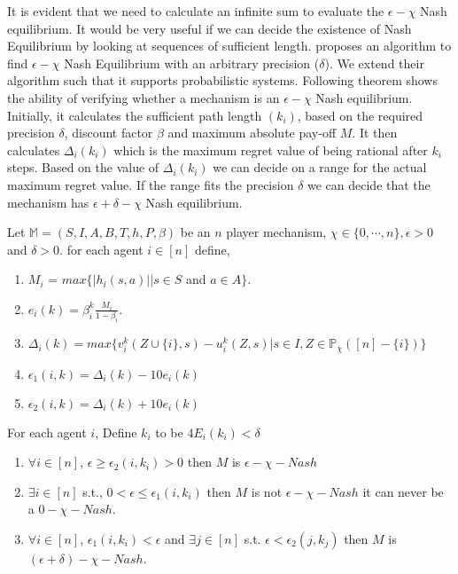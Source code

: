 
It is evident that we need to calculate an infinite sum to evaluate the $\epsilon - \chi$ Nash equilibrium. It would be very useful if we can decide the existence of Nash Equilibrium by looking at sequences of sufficient length. \cite{MMS08} proposes an algorithm to find $\epsilon - \chi$ Nash Equilibrium with an arbitrary precision ($\delta$). We extend their algorithm such that it supports probabilistic systems. Following theorem shows the ability of verifying whether a mechanism is an $\epsilon - \chi$ Nash equilibrium. Initially, it calculates the sufficient path length $(k_i)$, based on the required precision $\delta$, discount factor $\beta$ and maximum absolute pay-off $M$. It then calculates  $\Delta_i(k_i)$ which is the maximum regret value of being rational after $k_i$ steps. Based on the value of $\Delta_i(k_i)$ we can decide on a range for the actual maximum regret value. If the range fits the precision $\delta$ we can decide that the mechanism has $\epsilon + \delta- \chi$ Nash equilibrium.


\begin{theorem}
	\label{thm : correctness}
	Let $\mathbb{M} = (S,I,A,B,T,h,P,\beta)$ be an $n$ player mechanism, $\chi \in \{0,\cdots,n\}, \epsilon > 0$ and $\delta > 0$. for each agent $i \in [n]$ define, \\
	\begin{enumerate}
		\item $M_i$ = $max \{|h_i(s,a)| | s \in S$ and $a \in A\}$.
		\item $e_i(k) = \beta_i^{k} \frac{M_i}{1-\beta_i}$.
		\item $\Delta_i(k)=max\{v_i^{k}(Z \cup \{i\},s)- u_i^{k}(Z,s)|s\in I, Z \in \mathbb{P}_\chi([n]-\{i\}) \}$
		\item $\epsilon_1(i,k) = \Delta_i(k) - 10e_i(k)$
		\item $\epsilon_2(i,k) = \Delta_i(k) + 10e_i(k)$
	\end{enumerate}
	For each agent $i$, Define $k_i$ to be $4E_i(k_i) < \delta$\\
	\begin{enumerate}
		\item {} $\forall i \in [n]$, $\epsilon \ge \epsilon_2(i,k_i) > 0$ then $M$ is $\epsilon-\chi-Nash$
		\item {} $\exists i \in [n]$ s.t., $0 < \epsilon \le \epsilon_1(i,k_i)$ then $M$ is not $\epsilon-\chi-Nash$ it can never be a $0-\chi-Nash$.
		\item {} $\forall i \in [n]$, $\epsilon_1(i,k_i) < \epsilon$ and $\exists j \in [n]$ s.t. $\epsilon < \epsilon_2(j,k_j)$ then $M$ is $(\epsilon + \delta)-\chi-Nash$.
	\end{enumerate}
\end{theorem}

